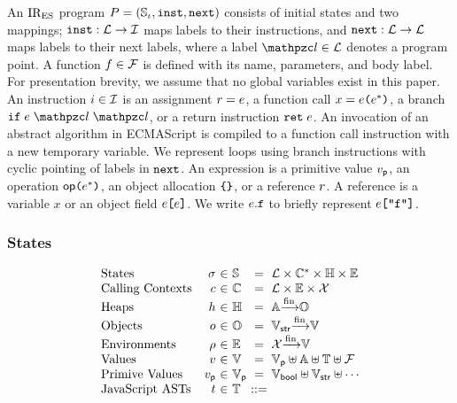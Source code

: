 An $\text{IR}_\text{ES}$ program $P = (\mathbb{S}_\iota, \texttt{inst}, \texttt{next})$ consists of initial
states and two mappings; $\texttt{inst}: \mathcal{L} \rightarrow \mathcal{I}$ maps labels to
their instructions, and $\texttt{next}: \mathcal{L} \rightarrow \mathcal{L}$ maps labels to
their next labels, where a label $\lab \in \labset$ denotes a program point.  A
function $f \in \mathcal{F}$ is defined with its name, parameters, and body
label.  For presentation brevity, we assume that no global variables exist in
this paper.  An instruction $i \in \mathcal{I}$ is an assignment $r =
e$, a function call $x = e \texttt{(} e^* \texttt{)}$, a branch $\kwif \;
\expr \; \lab \; \lab$, or a return instruction $\texttt{ret} \; e$.  An
invocation of an abstract algorithm in ECMAScript is compiled to a function call
instruction with a new temporary variable.  We represent loops using branch
instructions with cyclic pointing of labels in $\texttt{next}$.  An expression is a
primitive value $v_{\textsf{p}}$, an operation $\textsf{op} \texttt{(} e^* \texttt{)}$, an object
allocation $\texttt{\{} \texttt{\}}$, or a reference $r$.  A reference is a variable
$x$ or an object field $e \texttt{[} e \texttt{]}$.  We write $e.\texttt{f}$ to
briefly represent $e \texttt{[} \texttt{"f"} \texttt{]}$.


\subsubsection{States}

\[
  \begin{array}{lr@{~}c@{~}l@{~}c@{~}l}
    \text{States} & \st &\in& \stset &=&
    \labset \times \ctxtset^* \times \heapset \times \envset\\

    \text{Calling Contexts} & \ctxt &\in& \ctxtset &=&
    \labset \times \envset \times \varset\\

    \text{Heaps} & \heap &\in& \heapset &=&
    \addrset \finmap \objset\\

    \text{Objects} & \obj &\in& \objset &=&
    \strset \finmap \valset\\

    \text{Environments} & \env &\in& \envset &=&
    \varset \finmap \valset\\

    \text{Values} & \val &\in& \valset &=&
    \pvalset \uplus \addrset \uplus \treeset \uplus \funcset\\

    \text{Primive Values} & \pval &\in& \pvalset &=&
    \boolset \uplus \strset \uplus \cdots\\

    \text{JavaScript ASTs} & \tree &\in& \treeset &::=& \\
  \end{array}
\]

